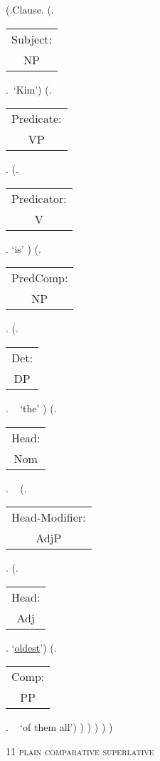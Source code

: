 \documentclass[12pt,letterpaper]{article}
\begin{document}
\begin{figure}
\begin{center}
\begin{parsetree}
			\hfill \break\hfill \break
			(.Clause.
			(.\begin{tabular}{c}Subject:\\NP\end{tabular}.~`Kim')
			(.\begin{tabular}{c}Predicate:\\VP\end{tabular}.
			(.\begin{tabular}{c}Predicator:\\V\end{tabular}. `is' )
			(.\begin{tabular}{c}PredComp:\\NP\end{tabular}. 
			(.\begin{tabular}{c}Det:\\DP\end{tabular}. ~ `the' )
			(.\begin{tabular}{c}Head:\\Nom\end{tabular}. ~
			(.\begin{tabular}{c}Head-Modifier:\\AdjP\end{tabular}. 
			(.\begin{tabular}{c}Head:\\Adj\end{tabular}. `\underline{oldest}')
			(.\begin{tabular}{c}Comp:\\PP\end{tabular}. ~ `of them all')
			)
			)
			)
			)
			)
			
			\hfill \break
		\end{parsetree}
		11 \textsc{plain	comparative	superlative}
	\end{center}
\end{figure}
\end{document}
